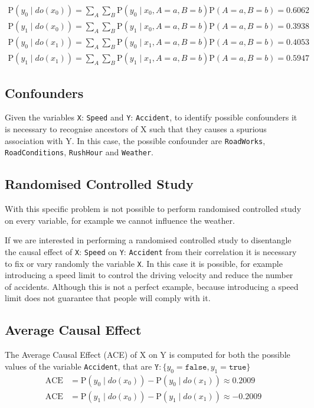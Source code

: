 \documentclass[a4paper,12pt]{article} %
\begin{document}
\begin{equation*}
\begin{aligned}
\text{P}(y_0 \mid {do}(x_0)) = \sum_{A}^{}\sum_{B}^{}	\text{P}(y_0 \mid x_0, A = a, B = b)\text{P}(A = a, B = b)  = 0.6062	
\\
\text{P}(y_1 \mid {do}(x_0)) = \sum_{A}^{}\sum_{B}^{}	\text{P}(y_1 \mid x_0, A = a, B = b)\text{P}(A = a, B = b) = 0.3938
\\
\text{P}(y_0 \mid {do}(x_1)) = \sum_{A}^{}\sum_{B}^{}	\text{P}(y_0 \mid x_1, A = a, B = b)\text{P}(A = a, B = b) =  0.4053	
\\
\text{P}(y_1 \mid {do}(x_1)) = \sum_{A}^{}\sum_{B}^{}	\text{P}(y_1 \mid x_1, A = a, B = b)\text{P}(A = a, B = b) =  0.5947
\end{aligned}
\end{equation*}

\subsection*{Confounders}
Given the variables \texttt{X}: \texttt{Speed} and \texttt{Y}: \texttt{Accident}, to identify possible confounders it is necessary to recognise ancestors of X such that they causes a spurious association with Y. In this case, the possible confounder are \texttt{RoadWorks}, \texttt{RoadConditions}, \texttt{RushHour} and \texttt{Weather}.

\subsection*{Randomised Controlled Study}
With this specific problem is not possible to perform randomised controlled study on every variable, for example we cannot influence the weather.

If we are interested in performing a randomised controlled study to disentangle the causal effect of \texttt{X}: \texttt{Speed} on \texttt{Y}: \texttt{Accident} from their correlation it is necessary to fix or vary randomly the variable \texttt{X}. In this case it is possible, for example introducing a speed limit to control the driving velocity and reduce the number of accidents. Although this is not a perfect example, because introducing a speed limit does not guarantee that people will comply with it.

\subsection*{Average Causal Effect}
The Average Causal Effect (ACE) of X on Y is computed for both the possible values of the variable \texttt{Accident}, that are $\mathtt{Y}: \{ y_0=\mathtt{false}, y_1=\mathtt{true}\}$ 
\begin{equation}
\begin{aligned}
\text{ACE}&=\text{P}(y_0 \mid {do}(x_0)) -\text{P}(y_0 \mid {do}(x_1)) \approx 0.2009
\\
\text{ACE}&=\text{P}(y_1 \mid {do}(x_0)) -\text{P}(y_1 \mid {do}(x_1)) \approx -0.2009
\end{aligned}
\end{equation}
\end{document}
